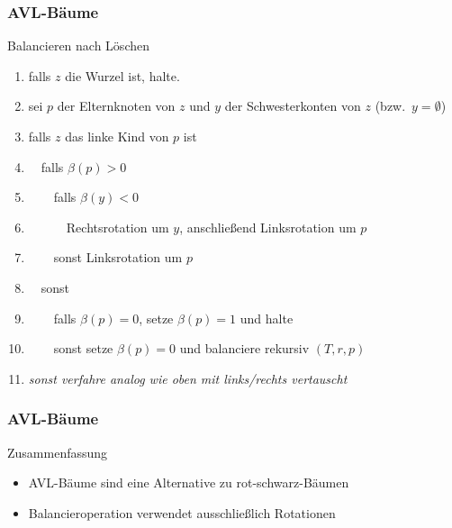 \documentclass[aspectratio=1610, 11pt]{beamer}
\newcommand{\mytitle}{AVL-B\"aume}
\begin{document}
\begin{frame}\frametitle{\mytitle}
	\begin{exampleblock}{Balancieren nach L\"oschen}
		\begin{enumerate}
			\item falls $z$ die Wurzel ist, halte.
			\item sei $p$ der Elternknoten von $z$ und $y$ der Schwesterkonten von $z$ (bzw.\ $y=\emptyset$)
			\item falls $z$ das linke Kind von $p$ ist
			\item $\quad$falls $\beta(p)>0$
			\item $\qquad$falls $\beta(y)<0$
			\item $\quad\qquad$Rechtsrotation um $y$, anschlie\ss end Linksrotation um $p$
			\item $\qquad$sonst Linksrotation um $p$
			\item $\quad$sonst
			\item $\qquad$falls $\beta(p)=0$, setze $\beta(p)=1$ und halte
			\item $\qquad$sonst setze $\beta(p)=0$ und balanciere rekursiv $(T,r,p)$
			\item \itshape sonst verfahre analog wie oben mit links/rechts vertauscht
		\end{enumerate}	
	\end{exampleblock}
\end{frame}

\begin{frame}\frametitle{\mytitle}
	\begin{exampleblock}{Zusammenfassung}
		\begin{itemize}
			\item AVL-B\"aume sind eine Alternative zu rot-schwarz-B\"aumen
			\item Balancieroperation verwendet ausschlie\ss lich Rotationen
		\end{itemize}	
	\end{exampleblock}
\end{frame}
\end{document}
